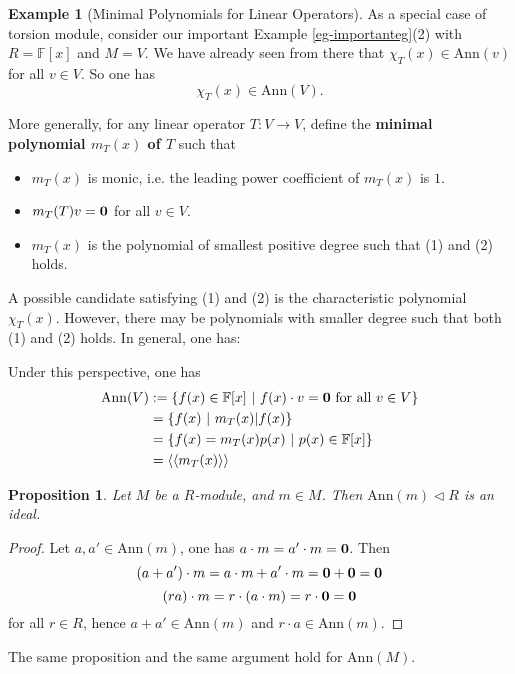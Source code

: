 \documentclass[11pt,openany]{book}
\theoremstyle{plain}
\newtheorem{proposition}[proposition]{Proposition}
\theoremstyle{definition}
\newtheorem{example}[example]{Example}
\theoremstyle{remark}
\begin{document}
\begin{example}[Minimal Polynomials for Linear Operators]
As a special case of torsion module, consider our important Example \ref{eg-importanteg}(2) with $R=\mathbb{F}[x]$ and $M=V$. We have already seen from there that
$\chi_T(x) \in \mathrm{Ann}(v)$ for all $v \in V$. So one has
$$\chi_T(x) \in \mathrm{Ann}(V).$$

More generally, for any linear operator $T:V \to V$, define the {\bf minimal polynomial $m_T(x)$ of $T$} such that
\begin{itemize}
    \item[(1)] $m_T(x)$ is monic, i.e. the leading power coefficient of $m_T(x)$ is $1$.
    \item[(2)] $m_T(T) v = {\bf 0}$ for all $v \in V$.
    \item[(3)] $m_T(x)$ is the polynomial of smallest positive degree such that (1) and (2) holds.
\end{itemize}

A possible candidate satisfying (1) and (2) is the characteristic polynomial $\chi_T(x)$. However, there may be polynomials with smaller degree such that both (1) and (2) holds. In general, one has:
\begin{center}
\end{center}
Under this perspective, one has
        \begin{align*}
            \mathrm{Ann}(V)&:=\{f(x) \in\mathbb{F}[x] \ |\ f(x)\cdot v = {\bf 0}\ \text{for all}\ v \in V \}\\
            &= \{ f(x)\ |\ m_T(x)| f(x)\}\\
            &= \{ f(x) = m_T(x)p(x) \ |\ p(x) \in \mathbb{F}[x]\}\\
            &=\langle\langle m_{T}(x)\rangle\rangle
        \end{align*}
\end{example}
    
\begin{proposition}
    Let $M$ be a $R$-module, and $m\in M$. Then $\mathrm{Ann}(m) \lhd R$ is an ideal.
\end{proposition}

\begin{proof}
    Let $a,a'\in \mathrm{Ann}(m)$, one has $a\cdot m=a'\cdot m={\bf 0}$. Then
    $$(a+a')\cdot m=a\cdot m+a'\cdot m={\bf 0}+{\bf 0}={\bf 0}$$
    $$(ra)\cdot m=r\cdot(a\cdot m)=r\cdot{\bf 0}={\bf 0}$$
    for all $r\in R$, hence $a+a'\in\mathrm{Ann}(m)$ and $r\cdot a\in\mathrm{Ann}(m)$.
\end{proof}
The same proposition and the same argument hold for $\mathrm{Ann}(M)$.
\end{document}
